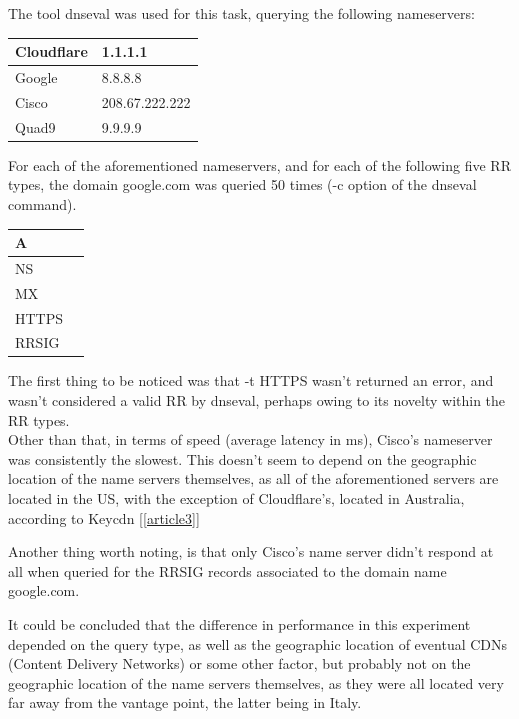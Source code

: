 \documentclass[a4paper,10pt]{article}
\begin{document}
The tool dnseval was used for this task, querying the following nameservers: 

\begin{table}[h!]
\centering
\begin{tabular}{|l|l|}
\hline
Cloudflare & 1.1.1.1        \\ \hline
Google     & 8.8.8.8        \\ \hline
Cisco      & 208.67.222.222 \\ \hline
Quad9      & 9.9.9.9        \\ \hline
\end{tabular}
\label{fig:table4}
\end{table}

For each of the aforementioned nameservers, and for each of the following five RR types,
the domain google.com was queried 50 times (-c option of the dnseval command). 


\begin{table}[h!]
\centering
\begin{tabular}{|l|l|}
\hline
A    \\ \hline
NS     \\ \hline
MX \\ \hline
HTTPS              \\ \hline
RRSIG              \\ \hline
\end{tabular}
\label{fig:table4}
\end{table}


The first thing to be noticed was that -t HTTPS wasn't returned an error, and wasn't considered a valid RR by dnseval, perhaps owing to its novelty within the RR types.\\

Other than that, in terms of speed (average latency in ms), Cisco's nameserver was consistently the slowest. This doesn't seem to depend on the geographic location of the name servers themselves, as all of the aforementioned servers are located in the US, with the exception of Cloudflare's, located in Australia, according to Keycdn [\ref{article3}] 

Another thing worth noting, is that only Cisco's name server didn't respond at all when queried for the RRSIG records associated to the domain name google.com.

It could be concluded that the difference in performance in this experiment depended on the query type, as well as the geographic location of eventual CDNs (Content Delivery Networks) or some other factor, but probably not on the geographic location of the name servers themselves, as they were all located very far away from the vantage point, the latter being in Italy.
\end{document}
